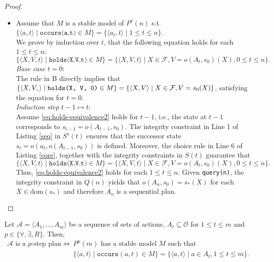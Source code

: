 \documentclass[
     11pt,                    %
     a4paper,             %
     BCOR=10mm,     %
     DIV=14,                 %
     listof=totoc,                    %
     bibliography=totoc,       %
     index=totoc,              %
     parskip            %
     twoside,
     headsepline
     ]{scrreprt}
\theoremstyle{definition}
\theoremstyle{definition}
\theoremstyle{remark}
\theoremstyle{bfnote}
\newcommand{\dom}{\mathrm{dom}}
\begin{document}
\begin{proof}
\begin{itemize}
  \item[($\Leftarrow$):]
    Assume that $M$ is a stable model of $P^s(n)$ s.t. $\{\langle a, t \rangle \mid \texttt{occurs(a,t)} \in M \} = \{\langle a_t, t \rangle \mid 1 \le t \le n \}$. \\
    We prove by induction over $t$, that the following equation holds for each $1 \le t \le n$:
    \begin{equation}
      \{\langle X, V, t \rangle \mid \texttt{holds(X,V,t)} \in M \} = \{\langle X, V, t \rangle \mid X \in \mathcal F, V=o(A_t, s_0)(X), 0 \le t \le n\}.
      \label{eq:holds-equivalence2}
    \end{equation}
    \textit{Base case }$t=0$: \\
    The rule in B directly implies that $\{\langle X, V, \rangle \mid \texttt{holds(X, V, 0)} \in M \} = \{\langle X, V \rangle \mid \\X \in \mathcal F, V = s_0(X)\}$,
    satisfying the equation for $t=0$. \\
    \textit{Induction step }$t-1 \mapsto t$: \\
    Assume \eqref{eq:holds-equivalence2} holds for $t-1$, i.e., the state at $t-1$ corresponds to $s_{t-1} = o(A_{t-1}, s_0)$. The integrity constraint in Line 1 of Listing \ref{seq} in $S^s(t)$ ensures that the successor state $s_t = o(a_{t}, o(A_{t-1}, s_0))$ is defined. Moreover, the choice rule in Line 6 of Listing \ref{core}, together with the integrity constraints in $S(t)$ guarantee that 
    \[
    \{\langle X, V, t \rangle \mid \texttt{holds(X,V,t)} \in M\} = \{\langle X, V, t \rangle \mid X \in \mathcal F, V = o(A_t, s_0)(X), 0 \le t \le n\}.
    \]
    Thus, \eqref{eq:holds-equivalence2} holds for each $1 \le t \le n$.
    Given \texttt{query(n)}, the integrity constraint in $Q(n)$ yields that $o(A_n, s_0) = s_*(X)$ for each $X \in \dom(s_*)$ and therefore $A_n$ is a sequential plan. 
\end{itemize}
\end{proof}

\begin{theo}
  Let $\mathcal A = \langle A_1, \dots, A_m \rangle$ be a sequence of sets of actions, $A_t \subseteq \mathcal{O}$ for $1 \le t \le m$ and $p \in \{\forall, \exists, R\}$. Then,
  \begin{align*}
      \mathcal A \text{ is a $p$-step plan} \iff &P^p(m) \text{ has a stable model } M \text{ such that} \\
        &\{\langle a, t \rangle \mid \texttt{occurs}(a,t) \in M \} = \{\langle a, t \rangle \mid a \in A_t, 1 \le t \le m \}.
  \end{align*}
\end{theo}
\end{document}
